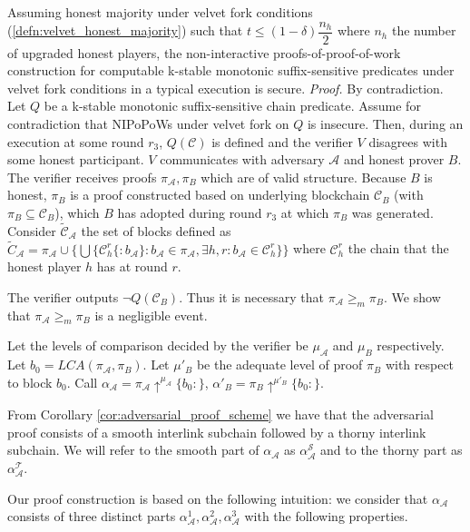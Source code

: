 \begin{theorem}
	Assuming honest majority under velvet fork conditions (\ref{defn:velvet_honest_majority}) such that $t \leq (1 - \delta) \dfrac{n_h}{2}$ where $n_h$ the number of upgraded honest players, the non-interactive proofs-of-proof-of-work construction for computable k-stable monotonic suffix-sensitive predicates under velvet fork conditions in a typical execution is secure.
\textit{Proof.} By contradiction. Let $Q$ be a k-stable monotonic suffix-sensitive chain
predicate. Assume for contradiction that NIPoPoWs under velvet fork on $Q$ is insecure. Then, during an execution at some round  $r_3$, $Q(\mathcal{C})$ is defined and the verifier $V$ disagrees with some honest participant. $V$ communicates with adversary $\mathcal{A}$ and honest prover $B$. The verifier receives proofs $\pi_\mathcal{A}, \pi_B$ which are of valid structure. Because $B$ is honest, $\pi_B$ is a proof constructed
based on underlying blockchain $\mathcal{C}_B$ (with $\pi_B \subseteq \mathcal{C}_B$), which $B$
has adopted during round $r_3$ at which $\pi_B$ was generated. Consider
$\widetilde{\mathcal{C}}_\mathcal{A}$ the set of blocks defined as
$\widetilde{C}_\mathcal{A} = \pi_\mathcal{A} \cup \{ \bigcup \{\mathcal{C}_h^r\{:b_\mathcal{A}\}:  b_\mathcal{A} \in \pi_\mathcal{A}, \exists h,r : b_\mathcal{A} \in 
\mathcal{C}_{h}^{r}\}  \}$ where $\mathcal{C}_h^r$ the chain 
 that the honest player $h$ has at round $r$.
\end{theorem}

The verifier outputs $\neg Q(\mathcal{C}_B)$. Thus it is necessary that $\pi_\mathcal{A} {\geq}_m \pi_B$.
We show that $\pi_\mathcal{A} {\geq}_m \pi_B$ is a negligible event.

Let the levels of comparison decided by the verifier
be $\mu_\mathcal{A}$ and $\mu_B$ respectively. Let $b_0 = LCA(\pi_\mathcal{A}, \pi_B)$. Let $\mu'_B$ be the adequate level of proof
$\pi_B$  with respect to block $b_0$. Call $\alpha_\mathcal{A} = \pi_\mathcal{A} \uparrow^{\mu_\mathcal{A}}\{b_0:\}$,
$\alpha'_B = \pi_B \uparrow^{\mu'_B}\{b_0:\}$.

From Corollary \ref{cor:adversarial_proof_scheme} we have that the adversarial proof 
consists of a smooth interlink subchain followed by a thorny interlink subchain. We will refer to the smooth part of $\alpha_\mathcal{A}$ as $\alpha^{\mathcal{S}}_\mathcal{A}$ and to the thorny part as $\alpha^{\mathcal{T}}_\mathcal{A}$.   

Our proof construction is based on the following intuition: we consider that $\alpha_\mathcal{A}$ consists of three distinct parts $\alpha_\mathcal{A}^1, \alpha_\mathcal{A}^2, \alpha_\mathcal{A}^3$ with the following properties. 


